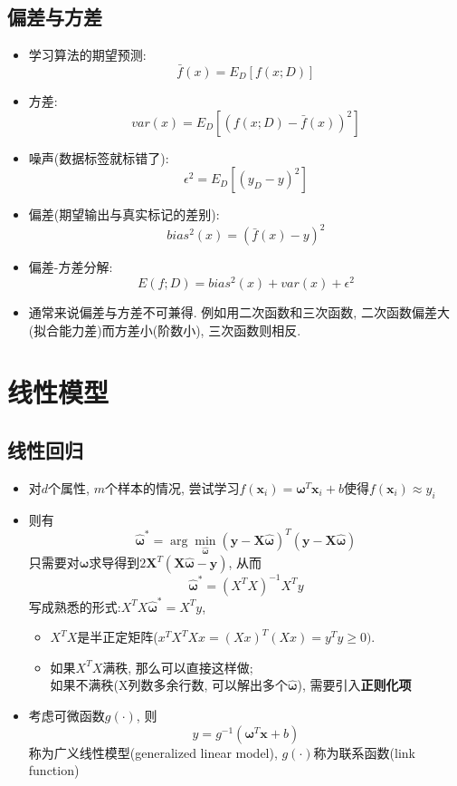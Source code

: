 \documentclass[UTF8]{article}
\begin{document}
\subsection{偏差与方差}
\begin{itemize}
\item 学习算法的期望预测:$$\bar{f}(x)=E_D[f(x;D)]$$
\item 方差: $$var(x)=E_D\left[(f(x;D)-\bar{f}(x))^2\right]$$
\item 噪声(数据标签就标错了): $$\epsilon^2=E_D\left[(y_D-y)^2\right]$$
\item 偏差(期望输出与真实标记的差别):$$bias^2(x)=(\bar{f}(x)-y)^2$$
\item 偏差-方差分解:$$E(f;D)=bias^2(x)+var(x)+\epsilon^2$$
\item 通常来说偏差与方差不可兼得. 例如用二次函数和三次函数, 二次函数偏差大(拟合能力差)而方差小(阶数小), 三次函数则相反.
\end{itemize}

\section{线性模型}
\subsection{线性回归}
\begin{itemize}
\item 对$d$个属性, $m$个样本的情况, 尝试学习$f(\bm{x}_i)=\bm{\omega}^T\bm{x}_i+b$使得$f(\bm{x}_i)\approx y_i$
\item 则有$$\hat{\bm{\omega}}^*=\arg\min\limits_{\hat{\bm{\omega}}}(\bm{y}-\bm{X}\hat{\bm{\omega}})^T(\bm{y}-\bm{X}\hat{\bm{\omega}})$$
只需要对$\hat{\bm{\omega}}$求导得到$2\bm{X}^T(\bm{X}\hat{\bm{\omega}}-\bm{y})$, 从而
$$\hat{\bm{\omega}}^*=(X^TX)^{-1}X^Ty$$
写成熟悉的形式:$X^TX\hat{\bm{\omega}}^*=X^Ty$, 
	\begin{itemize}
	\item $X^TX$是半正定矩阵($x^TX^TXx=(Xx)^T(Xx)=y^Ty\ge0).$
	\item 如果$X^TX$满秩, 那么可以直接这样做;\\
		如果不满秩(X列数多余行数, 可以解出多个$\hat{\bm{\omega}}$), 需要引入\textbf{正则化项}
	\end{itemize}
\item 考虑可微函数$g(\cdot)$, 则
$$y=g^{-1}(\bm{\omega}^T\bm{x}+b)$$
称为广义线性模型(generalized linear model), $g(\cdot)$称为联系函数(link function)
\end{itemize}
\end{document}
